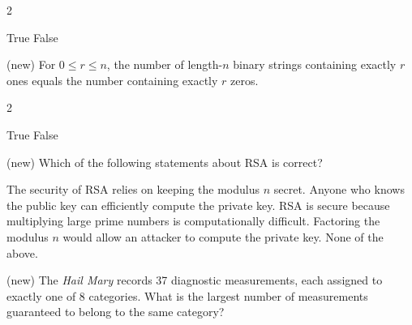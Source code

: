 \documentclass[11pt,addpoints]{exam}
\begin{document}
\begin{questions}
\begin{multicols}{2}
    \begin{choices}
        \choice True
        \choice False
    \end{choices}
\end{multicols}



\question[3] (new) For $0\leq r\leq n$, the number of length-$n$ binary strings containing exactly $r$ ones equals the number containing exactly $r$ zeros.

\begin{multicols}{2}
    \begin{choices}
        \choice True
        \choice False
    \end{choices}
\end{multicols}


\newpage





\question[5] (new) Which of the following statements about RSA is correct?

\begin{choices}
    \choice The security of RSA relies on keeping the modulus $n$ secret.
    \choice Anyone who knows the public key can efficiently compute the private key.
    \choice RSA is secure because multiplying large prime numbers is computationally difficult.
    \choice Factoring the modulus $n$ would allow an attacker to compute the private key.
    \choice None of the above.
\end{choices}


\question[5] (new) The \textit{Hail Mary} records 37 diagnostic measurements, each assigned to exactly one of 8 categories. What is the largest number of measurements guaranteed to belong to the same category?


\end{questions}
\end{document}
